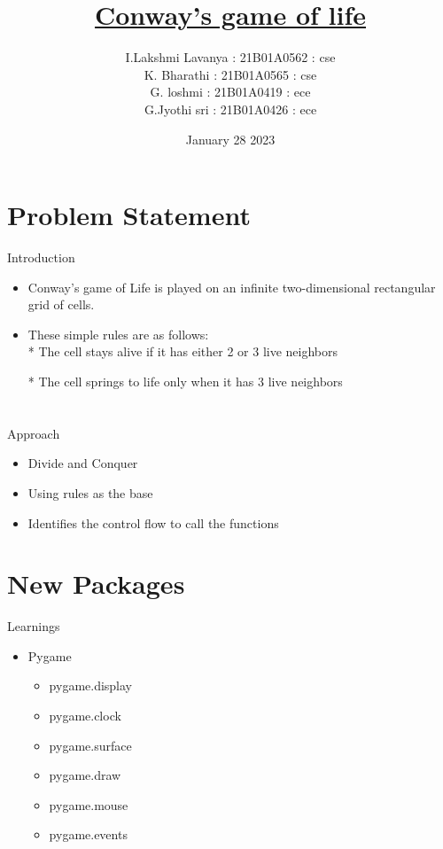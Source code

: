 \documentclass{beamer}
\title{\underline{Conway's game of life}}
\author[Svecw]{I.Lakshmi Lavanya : 21B01A0562 : cse \\ K. Bharathi :\;\;\;\;\;\;\; \;\;\;21B01A0565 : cse \\ G. loshmi : \;\;\;\;\;\;\;\;\;\;\;\;\;\;21B01A0419 : ece \\ G.Jyothi sri :\;\;\;\;\;\;\;\;\;\;\; 21B01A0426 : ece }
\date{January 28 2023}
\begin{document}
\begin{frame}
   \titlepage
\end{frame}

\section{Problem Statement}
\begin{frame}
{\huge Introduction}
\begin{itemize}
    \item Conway's game of Life is played on an infinite two-dimensional rectangular grid of cells. 

     \item These simple rules are as follows: \\
* The cell stays alive if it has either 2 or 3 live neighbors

* The cell springs to life only when it has 3 live neighbors

\end{itemize}
\end{frame}

\section{}

\begin{frame}{\huge Approach}

\begin{itemize}
     \item Divide and Conquer
     \item Using rules as the base
     \item Identifies the control flow to call the functions
\end{itemize}

\vskip 1cm

\end{frame}

\section{New Packages}

\begin{frame}{\huge Learnings}

\begin{itemize}
\item\huge Pygame 
\begin{itemize}
\vskip 1cm
\item pygame.display
\item pygame.clock
\item pygame.surface
\item pygame.draw
\item pygame.mouse
\item pygame.events
\end {itemize}
\end{itemize}
\end{frame}
\end{document}
